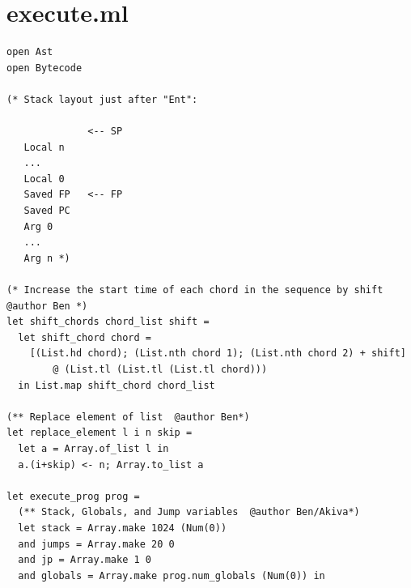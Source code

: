 \documentclass[12pt,A4]{book}
\begin{document}
\section{execute.ml}
\begin{verbatim}
open Ast
open Bytecode

(* Stack layout just after "Ent":

              <-- SP
   Local n
   ...
   Local 0
   Saved FP   <-- FP
   Saved PC
   Arg 0
   ...
   Arg n *)
 
(* Increase the start time of each chord in the sequence by shift  @author Ben *)   
let shift_chords chord_list shift =
  let shift_chord chord =
    [(List.hd chord); (List.nth chord 1); (List.nth chord 2) + shift] 
        @ (List.tl (List.tl (List.tl chord)))
  in List.map shift_chord chord_list
  
(** Replace element of list  @author Ben*)
let replace_element l i n skip = 
  let a = Array.of_list l in
  a.(i+skip) <- n; Array.to_list a

let execute_prog prog =
  (** Stack, Globals, and Jump variables  @author Ben/Akiva*)
  let stack = Array.make 1024 (Num(0))
  and jumps = Array.make 20 0 
  and jp = Array.make 1 0
  and globals = Array.make prog.num_globals (Num(0)) in


\end{verbatim}
\end{document}
